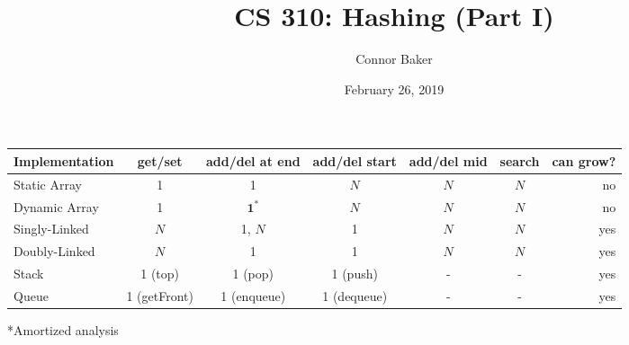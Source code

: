 \documentclass[10pt]{article}
\title{CS 310: Hashing (Part I)}
\author{Connor Baker}
\date{February 26, 2019}
\begin{document}
\maketitle

\begin{center}
    \begin{tabular}{lcccccr} \toprule
        Implementation & get/set & add/del at end & add/del start & add/del mid & search & can grow? \\ \midrule
        Static Array & 1 & 1 & $N$ & $N$ & $N$ & no \\
        Dynamic Array & 1 & $\mathbf{1^*}$ & $N$ & $N$ & $N$ & no \\
        Singly-Linked & $N$ & 1, $N$ & 1 & $N$ & $N$ & yes \\
        Doubly-Linked & $N$ & 1 & 1 & $N$ & $N$ & yes \\ 
        Stack & 1 (top) & 1 (pop) & 1 (push) & - & - & yes \\
        Queue & 1 (getFront) & 1 (enqueue) & 1 (dequeue) & - & - & yes \\ \bottomrule
    \end{tabular}
    \begin{center}*Amortized analysis\end{center}
\end{center}
\end{document}
